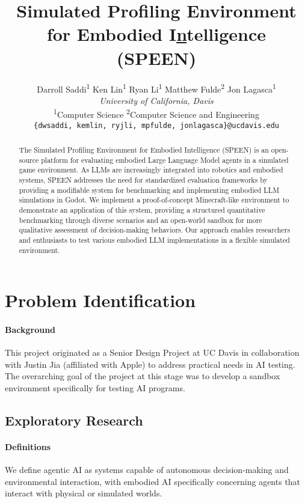 \documentclass{article}
\title{Simulated Profiling Environment for Embodied I\underline{n}telligence (SPEEN)}
\author{%
    Darroll Saddi\textsuperscript{1} \quad
        Ken Lin\textsuperscript{1} \quad
        Ryan Li\textsuperscript{1} \quad
        Matthew Fulde\textsuperscript{2} \quad
        Jon Lagasca\textsuperscript{1} \vspace{0.75em} \\
        \large{\textit{University of California, Davis}} \\
        \vspace{0.5em}
        \textsuperscript{1}Computer Science \quad
        \textsuperscript{2}Computer Science and Engineering \\
        \texttt{\{dwsaddi, kemlin, ryjli, mpfulde, jonlagasca\}@ucdavis.edu}
    }
\begin{document}
\maketitle

\begin{abstract}
    The Simulated Profiling Environment for Embodied Intelligence (SPEEN) is an open-source platform for evaluating embodied Large Language Model agents in a simulated game environment.
    As LLMs are increasingly integrated into robotics and embodied systems, SPEEN addresses the need for standardized evaluation frameworks by providing a modifiable system for benchmarking and implementing embodied LLM simulations in Godot.
    We implement a proof-of-concept Minecraft-like environment to demonstrate an application of this system, providing a structured quantitative benchmarking through diverse scenarios and an open-world sandbox for more qualitative assessment of decision-making behaviors.
    Our approach enables researchers and enthusiasts to test various embodied LLM implementations in a flexible simulated environment.
\end{abstract}

\section{Problem Identification}

\paragraph{Background}
This project originated as a Senior Design Project at UC Davis in collaboration with Justin Jia (affiliated with Apple) to address practical needs in AI testing.
The overarching goal of the project at this stage was to develop a sandbox environment specifically for testing AI programs.

\subsection{Exploratory Research}

\paragraph{Definitions}
We define agentic AI as systems capable of autonomous decision-making and environmental interaction, with embodied AI specifically concerning agents that interact with physical or simulated worlds.
\end{document}
